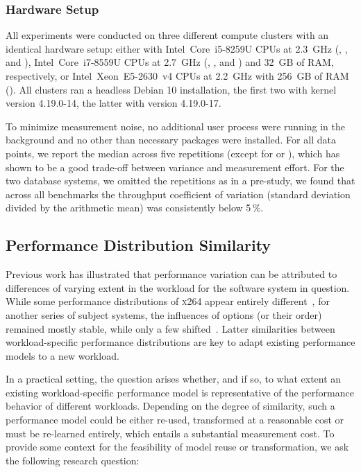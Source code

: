 {	\subsubsection{Hardware Setup}
	All experiments were conducted on three different compute clusters with an identical hardware setup: either with Intel~Core~i5-8259U CPUs at 2.3~GHz (\jumper, \kanzi, and \hsqldb),  Intel~Core~i7-8559U CPUs at 2.7~GHz (\dconvert, \batik, and \jadx) and 32~GB of RAM, respectively, or Intel~Xeon~E5-2630~v4 CPUs at 2.2~GHz with 256~GB of RAM (\htwo). All clusters ran a headless Debian 10 installation, the first two with kernel version \mbox{4.19.0-14}, the latter with version \mbox{4.19.0-17}. 
	
	To minimize measurement noise, no additional user process were running in the background and no other than necessary packages were installed.
	For all data points, we report the median across five repetitions (except for \hsqldb or \htwo), which has shown to be a good trade-off between variance and measurement effort. For the two database systems, we omitted the repetitions as in a pre-study, we found that across all benchmarks the throughput coefficient of variation (standard deviation divided by the arithmetic mean) was consistently below 5\,\%.
}

\subsection{Performance Distribution Similarity}
Previous work has illustrated that performance variation can be attributed to differences of varying extent in the workload for the software system in question. While some performance distributions of \textsc{x264} appear entirely different~\cite{alves_sampling_2020}, for another series of subject systems, the influences of options (or their order) remained mostly stable, while only a few shifted~\cite{jamshidi_transfer_gp_2017,jamishidi_transfer_2017}. Latter similarities between workload-specific performance distributions are key to adapt existing performance models to a new workload. 

In a practical setting, the question arises whether, and if so, to what extent an existing workload-specific performance model is representative of the performance behavior of different workloads. Depending on the degree of similarity, such a performance model could be either re-used, transformed at a reasonable cost or must be re-learned entirely, which entails a substantial measurement cost. To provide some context for the feasibility of model reuse or transformation, we ask the following research question: 

